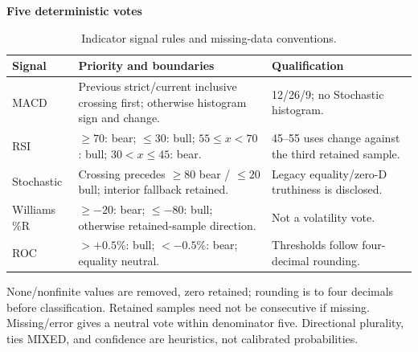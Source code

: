 \begin{table}[!htbp]
\centering\small
\setlength{\tabcolsep}{3pt}
\renewcommand{\arraystretch}{1.15}
\caption{Indicator signal rules and missing-data conventions.}
\label{tab:indicator_rules}
\textbf{Five deterministic votes}\par\smallskip
\begin{tabular}{lp{7.1cm}p{5.2cm}}
\hline
Signal & Priority and boundaries & Qualification \\
\hline
MACD & Previous strict/current inclusive crossing first; otherwise histogram sign and change. & 12/26/9; no Stochastic histogram. \\
RSI & $\ge70$: bear; $\le30$: bull; $55\le x<70$: bull; $30<x\le45$: bear. & 45--55 uses change against the third retained sample. \\
Stochastic & Crossing precedes $\ge80$ bear / $\le20$ bull; interior fallback retained. & Legacy equality/zero-D truthiness is disclosed. \\
Williams \%R & $\ge-20$: bear; $\le-80$: bull; otherwise retained-sample direction. & Not a volatility vote. \\
ROC & $>+0.5\%$: bull; $<-0.5\%$: bear; equality neutral. & Thresholds follow four-decimal rounding. \\
\hline
\end{tabular}\par\medskip
\begin{minipage}{\textwidth}\footnotesize None/nonfinite values are removed, zero retained; rounding is to four decimals before classification. Retained samples need not be consecutive if missing. Missing/error gives a neutral vote within denominator five. Directional plurality, ties MIXED, and confidence are heuristics, not calibrated probabilities.\end{minipage}
\end{table}
